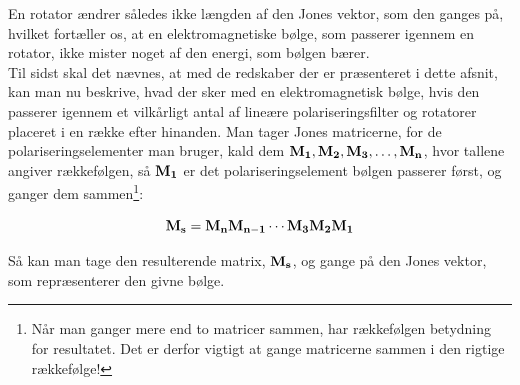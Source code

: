 En rotator ændrer således ikke længden af den Jones vektor, som den ganges på, hvilket fortæller os, at en elektromagnetiske bølge, som passerer igennem en rotator, ikke mister noget af den energi, som bølgen bærer.\\

Til sidst skal det nævnes, at med de redskaber der er præsenteret i dette afsnit, kan man nu beskrive, hvad der sker med en elektromagnetisk bølge, hvis den passerer igennem et vilkårligt antal af lineære polariseringsfilter og rotatorer placeret i en række efter hinanden. Man tager Jones matricerne, for de polariseringselementer man bruger, kald dem $\mathbf{M_1}, \mathbf{M_2}, \mathbf{M_3},\ldots,\mathbf{M_n}$, hvor tallene angiver rækkefølgen, så $\mathbf{M_1}$ er det polariseringselement bølgen passerer først, og ganger dem sammen\footnote{Når man ganger mere end to matricer sammen, har rækkefølgen betydning for resultatet. Det er derfor vigtigt at gange matricerne sammen i den rigtige rækkefølge! }:

\begin{equation}
\mathbf{M_s} = \mathbf{M_n} \mathbf{M_{n-1} \cdots \mathbf{M_3} \mathbf{M_2} \mathbf{M_1} }  
\end{equation}  

\vspace{2mm}

Så kan man tage den resulterende matrix, $\mathbf{M_s}$, og gange på den Jones vektor, som repræsenterer den givne bølge.

